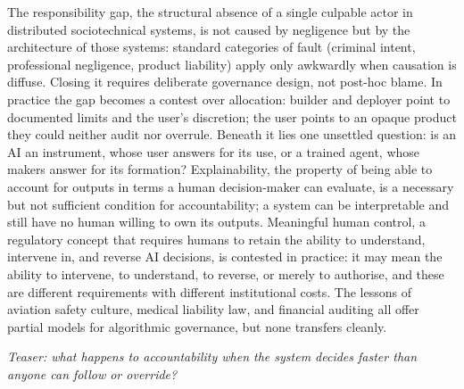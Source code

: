 The responsibility gap, the structural absence of a single culpable
actor in distributed sociotechnical systems, is not caused by
negligence but by the architecture of those systems: standard
categories of fault (criminal intent, professional negligence, product
liability) apply only awkwardly when causation is diffuse. Closing it
requires deliberate governance design, not post-hoc blame. In practice the
gap becomes a contest over allocation: builder and deployer point to
documented limits and the user's discretion; the user points to an opaque
product they could neither audit nor overrule. Beneath it lies one
unsettled question: is an AI an instrument, whose user answers for its use,
or a trained agent, whose makers answer for its formation? Explainability, the
property of being able to account for outputs in terms a human
decision-maker can evaluate, is a necessary but not sufficient
condition for accountability; a system can be interpretable and still
have no human willing to own its outputs. Meaningful human control, a
regulatory concept that requires humans to retain the ability to
understand, intervene in, and reverse AI decisions, is contested in
practice: it may mean the ability to intervene, to understand, to
reverse, or merely to authorise, and these are different requirements
with different institutional costs. The lessons of aviation safety culture, medical liability law,
and financial auditing all offer partial models for algorithmic governance, but none transfers cleanly.

\medskip
\noindent\textit{Teaser: what happens to accountability when the system
decides faster than anyone can follow or override?}

\clearpage
